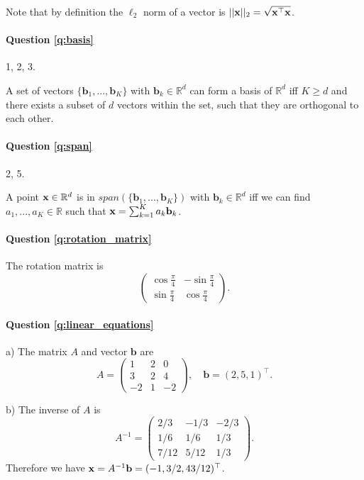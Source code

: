 Note that by definition the $\ell_2$ norm of a vector is $|| \mathbf{x} ||_2 = \sqrt{\mathbf{x}^\top \mathbf{x}}$.

\paragraph{Question \ref{q:basis}} 1, 2, 3. 

A set of vectors $\{\mathbf{b}_1, ..., \mathbf{b}_K \}$ with $\mathbf{b}_k \in \mathbb{R}^d$ can form a basis of $\mathbb{R}^d$ iff $K \geq d$ and there exists a subset of $d$ vectors within the set, such that they are orthogonal to each other.

\paragraph{Question \ref{q:span}} 2, 5. 

A point $\mathbf{x} \in \mathbb{R}^d$ is in $span(\{\mathbf{b}_1, ..., \mathbf{b}_K \})$ with $\mathbf{b}_k \in \mathbb{R}^d$ iff we can find $a_1, ..., a_K \in \mathbb{R}$ such that $\mathbf{x} = \sum_{k=1}^K a_k \mathbf{b}_k$.

\paragraph{Question \ref{q:rotation_matrix}} The rotation matrix is 
\begin{equation*}
    \begin{pmatrix}
    \cos{\frac{\pi}{4}} & -\sin{\frac{\pi}{4}} \\
    \sin{\frac{\pi}{4}} & \cos{\frac{\pi}{4}}
    \end{pmatrix}.
\end{equation*}

\paragraph{Question \ref{q:linear_equations}}

a) The matrix $A$ and vector $\mathbf{b}$ are
\begin{equation*}
A = \begin{pmatrix}
1 & 2 & 0 \\
3 & 2 & 4 \\
-2 & 1 & -2
\end{pmatrix}, \quad \mathbf{b} = (2, 5, 1)^\top.
\end{equation*}

b) The inverse of $A$ is 
\begin{equation*}
A^{-1} = \begin{pmatrix}
2/3 & -1/3 & -2/3 \\
1/6 & 1/6 & 1/3 \\
7/12 & 5/12 & 1/3
\end{pmatrix}.
\end{equation*}
Therefore we have $\mathbf{x} = A^{-1} \mathbf{b} = (-1, 3/2, 43/12)^\top$.

